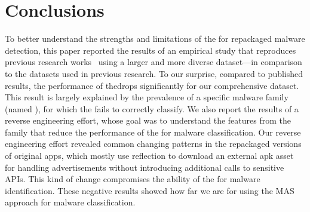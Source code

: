 \section{Conclusions}\label{sec:conclusions}

To better understand the strengths and limitations of the \mas for repackaged malware detection, this paper reported the results of an empirical study that reproduces previous research works~\cite{DBLP:conf/wcre/BaoLL18,DBLP:journals/jss/CostaMMSSBNR22} using a larger and more diverse dataset---in comparison to the datasets used in previous research. To our surprise, compared to published results, the performance of the\mas drops significantly for our comprehensive dataset. This result is largely explained by the prevalence of a specific malware family (named \gps), for which the \mas fails to correctly classify. We also report the results of a reverse engineering effort, whose goal was to understand the features from the \gps family that reduce the performance of the \mas for malware classification. Our reverse engineering effort revealed common changing patterns in the \gps repackaged versions of original apps, which mostly use reflection to download an external apk asset for handling advertisements without introducing additional calls to sensitive APIs. This kind of change compromises the ability of the \mas for malware identification. These negative results
showed how far we are for using the MAS approach for malware classification.



